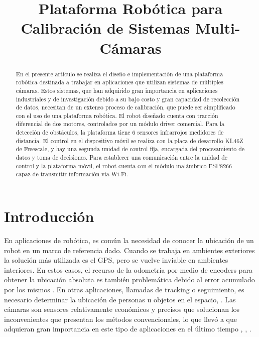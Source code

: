 \documentclass[conference,a4paper,9pt]{IEEEtran}
\begin{document}

\captionsetup[figure]{name=Fig.}
\title{Plataforma Robótica para Calibración de Sistemas Multi-Cámaras}

\author{
}


\maketitle

\begin{abstract}
En el presente artículo se realiza el diseño e implementación de una plataforma robótica destinada a trabajar en aplicaciones que utilizan sistemas de múltiples cámaras. Estos sistemas, que han adquirido gran importancia en aplicaciones industriales y de investigación debido a su bajo costo y gran capacidad de recolección de datos, necesitan de un extenso proceso de calibración, que puede ser simplificado con el uso de una plataforma robótica. El robot diseñado cuenta con tracción diferencial de dos motores, controlados por un módulo driver comercial. Para la detección de obstáculos, la plataforma tiene 6 sensores infrarrojos medidores de distancia. El control en el dispositivo móvil se realiza con la placa de desarrollo KL46Z de Freescale, y hay una segunda unidad de control fija, encargada del procesamiento de datos y toma de decisiones. Para establecer una comunicación entre la unidad de control y la plataforma móvil, el robot cuenta con el módulo inalámbrico ESP8266 capaz de transmitir información vía Wi-Fi.
\end{abstract}

\IEEEpeerreviewmaketitle

\section{Introducción}

En aplicaciones de robótica, es común la necesidad de conocer la ubicación de un robot en un marco de referencia dado. Cuando se trabaja en ambientes exteriores la solución más utilizada es el GPS, pero se vuelve inviable en ambientes interiores. En estos casos, el recurso de la odometría por medio de encoders para obtener la ubicación absoluta es también problemática debido al error acumulado por los mismos \cite{encoders}. En otras aplicaciones, llamadas de tracking o seguimiento, es necesario determinar la ubicación de personas u objetos en el espacio, \cite{tracking}. Las cámaras son sensores relativamente económicos y precisos que solucionan los inconvenientes que presentan los métodos convencionales, lo que llevó a que adquieran gran importancia en este tipo de aplicaciones en el último tiempo  \cite{camara1}, \cite{camara2}, \cite{camara3}.
\end{document}
